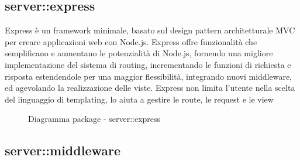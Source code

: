 \subsection{server::express}
Express è un framework minimale, basato sul design pattern architetturale MVC per creare applicazioni web con Node.js. Express offre funzionalità che semplificano e aumentano le potenzialità di Node.js, fornendo una migliore implementazione del sistema di routing, incrementando
le funzioni di richiesta e risposta estendendole per una maggior flessibilità, integrando nuovi middleware, ed agevolando la realizzazione delle viste.
Express non limita l’utente nella scelta del linguaggio di templating, lo aiuta a gestire le route, le request e le view\begin{center}
	\begin{figure}[H]
		\caption{Diagramma package - server::express}
	\end{figure}
\end{center}\subsection{server::middleware}
